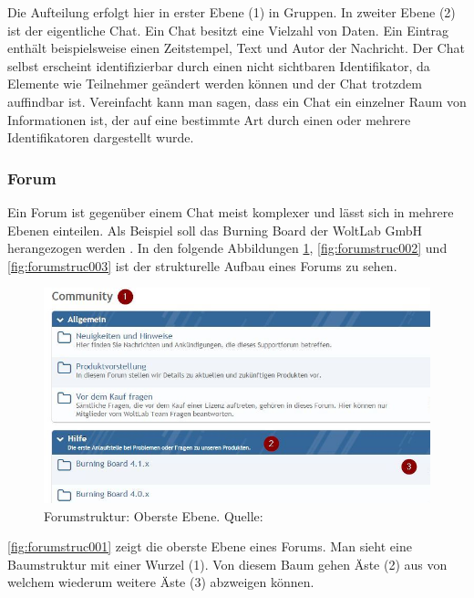\documentclass[a4paper]{article}
\begin{document}
	Die Aufteilung erfolgt hier in erster Ebene (1) in Gruppen. In zweiter Ebene (2)
	ist der eigentliche Chat. Ein Chat besitzt eine Vielzahl von Daten. Ein
	Eintrag enthält beispielsweise einen Zeitstempel, Text und Autor der
	Nachricht. Der Chat selbst erscheint identifizierbar durch einen nicht
	sichtbaren Identifikator, da Elemente wie Teilnehmer geändert werden können
	und der Chat trotzdem auffindbar ist. Vereinfacht kann man sagen, dass ein
	Chat ein einzelner Raum von Informationen ist, der auf eine bestimmte Art
	durch einen oder mehrere Identifikatoren dargestellt wurde.
	
	\subsubsection{Forum}	
	
	Ein Forum ist gegenüber einem Chat meist komplexer und lässt sich in mehrere
	Ebenen einteilen. Als Beispiel soll das	Burning Board der WoltLab GmbH
	herangezogen werden \cite{BB}. In den folgende Abbildungen
	\ref{fig:forumstruc001}, \ref{fig:forumstruc002} und \ref{fig:forumstruc003}
	ist der strukturelle Aufbau eines Forums zu sehen.
	
	\begin{figure}[H] 
		\centerline{
			\includegraphics[scale=0.65]{../Bilder/forumstruc001.jpg}
		}
		\caption{Forumstruktur: Oberste Ebene. Quelle: \cite{BB}}
		\label{fig:forumstruc001}
	\end{figure}	
	
	\autoref{fig:forumstruc001} zeigt die oberste Ebene eines Forums. Man sieht
	eine Baumstruktur mit einer Wurzel (1). Von diesem Baum gehen Äste (2) aus
	von welchem wiederum weitere Äste (3) abzweigen können.
	
\end{document}
